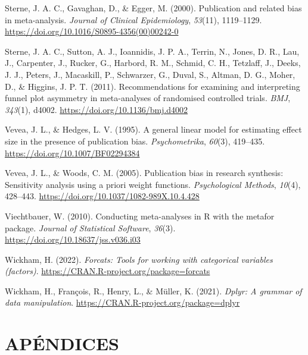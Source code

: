 \documentclass[
  bookmarksnumbered]{article}
\newlength{\cslhangindent}
\newlength{\cslentryspacingunit} %
\newenvironment{CSLReferences}[2] %
 {%
  \setlength{\parindent}{0pt}
  \ifodd #1
  \let\oldpar\par
  \def\par{\hangindent=\cslhangindent\oldpar}
  \fi
  \setlength{\parskip}{#2\cslentryspacingunit}
 }%
 {}
\begin{document}
\begin{CSLReferences}{1}{0}
\leavevmode{}%
Sterne, J. A. C., Gavaghan, D., \& Egger, M. (2000). Publication and related bias in meta-analysis. \emph{Journal of Clinical Epidemiology}, \emph{53}(11), 1119--1129. \url{https://doi.org/10.1016/S0895-4356(00)00242-0}

\leavevmode{}%
Sterne, J. A. C., Sutton, A. J., Ioannidis, J. P. A., Terrin, N., Jones, D. R., Lau, J., Carpenter, J., Rucker, G., Harbord, R. M., Schmid, C. H., Tetzlaff, J., Deeks, J. J., Peters, J., Macaskill, P., Schwarzer, G., Duval, S., Altman, D. G., Moher, D., \& Higgins, J. P. T. (2011). Recommendations for examining and interpreting funnel plot asymmetry in meta-analyses of randomised controlled trials. \emph{BMJ}, \emph{343}(1), d4002. \url{https://doi.org/10.1136/bmj.d4002}

\leavevmode{}%
Vevea, J. L., \& Hedges, L. V. (1995). A general linear model for estimating effect size in the presence of publication bias. \emph{Psychometrika}, \emph{60}(3), 419--435. \url{https://doi.org/10.1007/BF02294384}

\leavevmode{}%
Vevea, J. L., \& Woods, C. M. (2005). Publication bias in research synthesis: Sensitivity analysis using a priori weight functions. \emph{Psychological Methods}, \emph{10}(4), 428--443. \url{https://doi.org/10.1037/1082-989X.10.4.428}

\leavevmode{}%
Viechtbauer, W. (2010). Conducting meta-analyses in {R} with the metafor package. \emph{Journal of Statistical Software}, \emph{36}(3). \url{https://doi.org/10.18637/jss.v036.i03}

\leavevmode{}%
Wickham, H. (2022). \emph{Forcats: Tools for working with categorical variables (factors)}. \url{https://CRAN.R-project.org/package=forcats}

\leavevmode{}%
Wickham, H., François, R., Henry, L., \& Müller, K. (2021). \emph{Dplyr: A grammar of data manipulation}. \url{https://CRAN.R-project.org/package=dplyr}

\end{CSLReferences}

\newpage

\hypertarget{apuxe9ndices}{%
\section*{APÉNDICES}\label{apuxe9ndices}}
\end{document}
